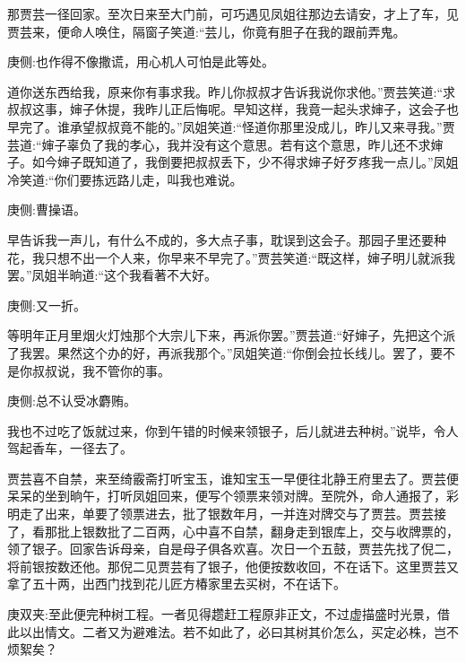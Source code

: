 \begin{parag}
    那贾芸一径回家。至次日来至大门前，可巧遇见凤姐往那边去请安，才上了车，见贾芸来，便命人唤住，隔窗子笑道:“芸儿，你竟有胆子在我的跟前弄鬼。\begin{note}庚侧:也作得不像撒谎，用心机人可怕是此等处。\end{note}道你送东西给我，原来你有事求我。昨儿你叔叔才告诉我说你求他。”贾芸笑道:“求叔叔这事，婶子休提，我昨儿正后悔呢。早知这样，我竟一起头求婶子，这会子也早完了。谁承望叔叔竟不能的。”凤姐笑道:“怪道你那里没成儿，昨儿又来寻我。”贾芸道:“婶子辜负了我的孝心，我并没有这个意思。若有这个意思，昨儿还不求婶子。如今婶子既知道了，我倒要把叔叔丢下，少不得求婶子好歹疼我一点儿。”凤姐冷笑道:“你们要拣远路儿走，叫我也难说。\begin{note}庚侧:曹操语。\end{note}早告诉我一声儿，有什么不成的，多大点子事，耽误到这会子。那园子里还要种花，我只想不出一个人来，你早来不早完了。”贾芸笑道:“既这样，婶子明儿就派我罢。”凤姐半晌道:“这个我看著不大好。\begin{note}庚侧:又一折。\end{note}等明年正月里烟火灯烛那个大宗儿下来，再派你罢。”贾芸道:“好婶子，先把这个派了我罢。果然这个办的好，再派我那个。”凤姐笑道:“你倒会拉长线儿。罢了，要不是你叔叔说，我不管你的事。\begin{note}庚侧:总不认受冰麝贿。\end{note}我也不过吃了饭就过来，你到午错的时候来领银子，后儿就进去种树。”说毕，令人驾起香车，一径去了。
\end{parag}


\begin{parag}
    贾芸喜不自禁，来至绮霰斋打听宝玉，谁知宝玉一早便往北静王府里去了。贾芸便呆呆的坐到晌午，打听凤姐回来，便写个领票来领对牌。至院外，命人通报了，彩明走了出来，单要了领票进去，批了银数年月，一并连对牌交与了贾芸。贾芸接了，看那批上银数批了二百两，心中喜不自禁，翻身走到银库上，交与收牌票的，领了银子。回家告诉母亲，自是母子俱各欢喜。次日一个五鼓，贾芸先找了倪二，将前银按数还他。那倪二见贾芸有了银子，他便按数收回，不在话下。这里贾芸又拿了五十两，出西门找到花儿匠方椿家里去买树，不在话下。\begin{note}庚双夹:至此便完种树工程。一者见得趱赶工程原非正文，不过虚描盛时光景，借此以出情文。二者又为避难法。若不如此了，必曰其树其价怎么，买定必株，岂不烦絮矣？\end{note}
\end{parag}


